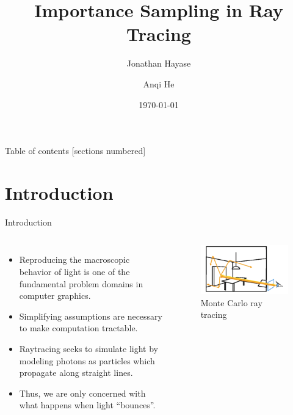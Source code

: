 \documentclass[10pt]{beamer}
\title{Importance Sampling in Ray Tracing}
\subtitle{}
\date{\today}
\author{Jonathan Hayase \and Anqi He}
\institute{Math 164 -- Scientific Computing -- Spring 2018}
\begin{document}
\maketitle

\begin{frame}{Table of contents}
  [sections numbered]
  \tableofcontents[hideallsubsections]
\end{frame}

\section{Introduction}

\begin{frame}{Introduction}
  \begin{columns}
    \begin{itemize}
    \item Reproducing the macroscopic behavior of light is one of the fundamental problem domains in computer graphics.
    \item Simplifying assumptions are necessary to make computation tractable.
    \item Raytracing seeks to simulate light by modeling photons as particles which propagate along straight lines.
    \item Thus, we are only concerned with what happens when light ``bounces''.
    \end{itemize}

    \begin{figure}[H]
      \centering
      \includegraphics[width=\linewidth,keepaspectratio]{intro.png}
      \caption{Monte Carlo ray tracing}
    \end{figure}
  \end{columns}
\end{frame}
\end{document}
